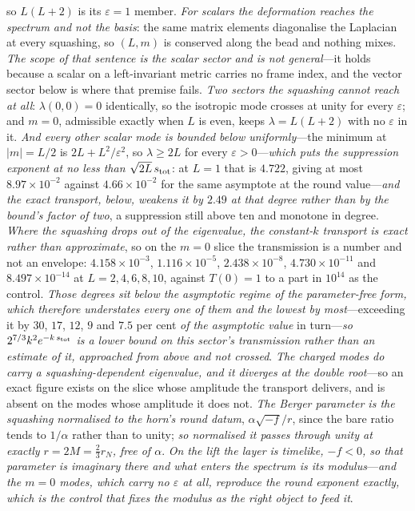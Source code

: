 \documentclass[11pt,a4paper]{article}
\theoremstyle{plain}
\theoremstyle{definition}
\theoremstyle{remark}
\begin{document}
so $L(L+2)$ is its $\varepsilon=1$ member. \emph{For scalars the deformation reaches the spectrum and not the basis}: the same matrix elements diagonalise the Laplacian at every squashing, so $(L,m)$ is conserved along the bead and nothing mixes. \emph{The scope of that sentence is the scalar sector and is not general}---it holds because a scalar on a left-invariant metric carries no frame index, and the vector sector below is where that premise fails. \emph{Two sectors the squashing cannot reach at all}: $\lambda(0,0)=0$ identically, so the isotropic mode crosses at unity for every $\varepsilon$; and $m=0$, admissible exactly when $L$ is even, keeps $\lambda=L(L+2)$ with no $\varepsilon$ in it. \emph{And every other scalar mode is bounded below uniformly}---the minimum at $|m|=L/2$ is $2L+L^2/\varepsilon^2$, so $\lambda\ge2L$ for every $\varepsilon>0$---\emph{which puts the suppression exponent at no less than $\sqrt{2L}\,s_{\rm tot}$}: at $L=1$ that is $4.722$, giving at most $8.97\times10^{-2}$ against $4.66\times10^{-2}$ for the same asymptote at the round value---\emph{and the exact transport, below, weakens it by $2.49$ at that degree rather than by the bound's factor of two}, a suppression still above ten and monotone in degree. \emph{Where the squashing drops out of the eigenvalue, the constant-$k$ transport is exact rather than approximate}, so on the $m=0$ slice the transmission is a number and not an envelope: $4.158\times10^{-3}$, $1.116\times10^{-5}$, $2.438\times10^{-8}$, $4.730\times10^{-11}$ and $8.497\times10^{-14}$ at $L=2,4,6,8,10$, against $T(0)=1$ to a part in $10^{14}$ as the control. \emph{Those degrees sit below the asymptotic regime of the parameter-free form, which therefore understates every one of them and the lowest by most}---exceeding it by $30$, $17$, $12$, $9$ and $7.5$ per cent \emph{of the asymptotic value} in turn---\emph{so $2^{7/3}k^2e^{-k\,s_{\rm tot}}$ is a lower bound on this sector's transmission rather than an estimate of it, approached from above and not crossed}. \emph{The charged modes do carry a squashing-dependent eigenvalue, and it diverges at the double root}---so an exact figure exists on the slice whose amplitude the transport delivers, and is absent on the modes whose amplitude it does not. \emph{The Berger parameter is the squashing normalised to the horn's round datum}, $\alpha\sqrt{-f}/r$, since the bare ratio tends to $1/\alpha$ rather than to unity; \emph{so normalised it passes through unity at exactly $r=2M=\tfrac23r_{N}$, free of $\alpha$}. \emph{On the lift the layer is timelike, $-f<0$, so that parameter is imaginary there and what enters the spectrum is its modulus}---\emph{and the $m=0$ modes, which carry no $\varepsilon$ at all, reproduce the round exponent exactly, which is the control that fixes the modulus as the right object to feed it}. 
\end{document}
